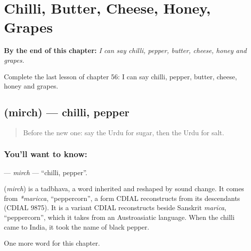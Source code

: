 
\chapter{Chilli, Butter, Cheese, Honey, Grapes}
\label{ch:ur-chilli-butter-cheese-honey-grapes}

\begin{chapteropening}
\textbf{By the end of this chapter:} \emph{I can say chilli, pepper, butter, cheese, honey and grapes.}

Complete the last lesson of chapter 56: I can say chilli, pepper, butter, cheese, honey and grapes.
\end{chapteropening}

\section[\texorpdfstring{\ur{مرچ} (mirch)}{مرچ (mirch)}]{ (mirch) — chilli, pepper}

\label{lesson:UR-C56-mirch}



\begin{quote}
Before the new one: say the Urdu for sugar, then the Urdu for salt.
\end{quote}

\subsection*{You'll want to know: }
\textbf{} — \emph{mirch} — \textquotedblleft{}chilli, pepper\textquotedblright{}.

\begin{cousinweb}
\textbf{} (\emph{mirch}) is a tadbhava, a word inherited and reshaped by sound change. It comes from \emph{*maricca}, \textquotedblleft{}peppercorn\textquotedblright{}, a form CDIAL reconstructs from its descendants (CDIAL 9875). It is a variant CDIAL reconstructs beside Sanskrit \emph{marīca}, \textquotedblleft{}peppercorn\textquotedblright{}, which it takes from an Austroasiatic language. When the chilli came to India, it took the name of black pepper.
\end{cousinweb}

\begin{grammarlens}[title={What you've built}]
One more word for this chapter.
\end{grammarlens}

